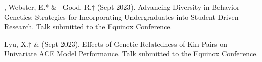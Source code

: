

\item \meb, Webster, E.* \& \ Good, R.$\dagger$ (Sept 2023). Advancing Diversity in Behavior Genetics: Strategies for Incorporating Undergraduates into Student-Driven Research. Talk submitted to the Equinox Conference.

\item Lyu, X.$\dagger$ \& \meb (Sept 2023). Effects of Genetic Relatedness of Kin Pairs on Univariate ACE Model Performance. Talk submitted to the Equinox Conference.





%
%

%

%

%

%
